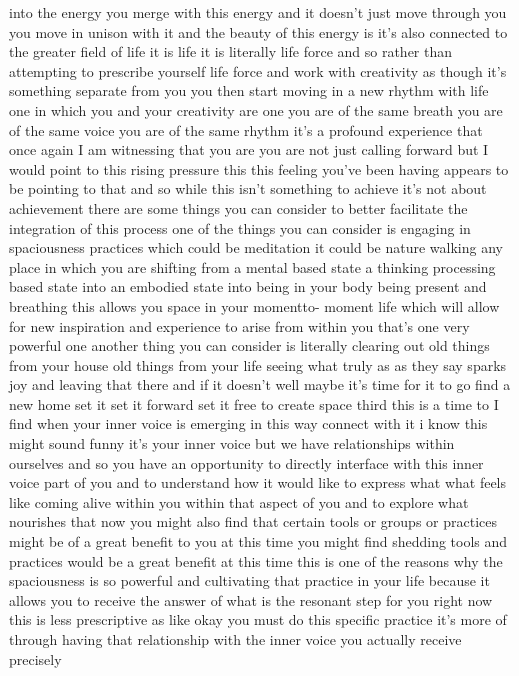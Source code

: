 \documentclass{article}
\begin{document}
into the energy you merge with this energy and it doesn't just move
through you you move in unison with it and the beauty of this energy is
it's also connected to the greater field of life it is life it is
literally life force and so rather than attempting to prescribe yourself
life force and work with creativity as though it's something separate
from you you then start moving in a new rhythm with life one in which
you and your creativity are one you are of the same breath you are of
the same voice you are of the same rhythm it's a profound experience
that once again I am witnessing that you are you are not just calling
forward but I would point to this rising pressure this this feeling
you've been having appears to be pointing to that and so while this
isn't something to achieve it's not about achievement there are some
things you can consider to better facilitate the integration of this
process one of the things you can consider is engaging in spaciousness
practices which could be meditation it could be nature walking any place
in which you are shifting from a mental based state a thinking
processing based state into an embodied state into being in your body
being present and breathing this allows you space in your momentto-
moment life which will allow for new inspiration and experience to arise
from within you that's one very powerful one another thing you can
consider is literally clearing out old things from your house old things
from your life seeing what truly as as they say sparks joy and leaving
that there and if it doesn't well maybe it's time for it to go find a
new home set it set it forward set it free to create space third this is
a time to I find when your inner voice is emerging in this way connect
with it i know this might sound funny it's your inner voice but we have
relationships within ourselves and so you have an opportunity to
directly interface with this inner voice part of you and to understand
how it would like to express what what feels like coming alive within
you within that aspect of you and to explore what nourishes that now you
might also find that certain tools or groups or practices might be of a
great benefit to you at this time you might find shedding tools and
practices would be a great benefit at this time this is one of the
reasons why the spaciousness is so powerful and cultivating that
practice in your life because it allows you to receive the answer of
what is the resonant step for you right now this is less prescriptive as
like okay you must do this specific practice it's more of through having
that relationship with the inner voice you actually receive precisely
\end{document}
